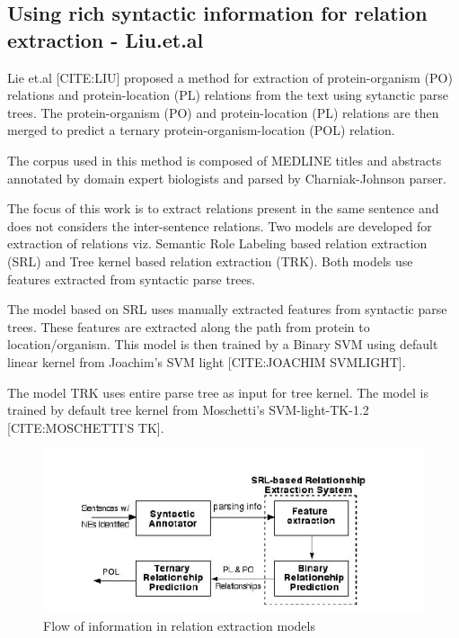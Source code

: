 \subsection*{Using rich syntactic information for relation extraction - Liu.et.al}

Lie et.al [CITE:LIU] proposed a method for extraction of protein-organism (PO) relations and protein-location (PL) relations from the text using sytanctic parse trees. The protein-organism (PO) and protein-location (PL) relations are then merged to predict a ternary protein-organism-location (POL) relation.

The corpus used in this method is composed of MEDLINE titles and abstracts annotated by domain expert biologists and parsed by Charniak-Johnson parser.

The focus of this work is to extract relations present in the same sentence and does not considers the inter-sentence relations. Two models are developed for extraction of relations viz. Semantic Role Labeling based relation extraction (SRL) and Tree kernel based relation extraction (TRK). Both models use features extracted from syntactic parse trees.

The model based on SRL uses manually extracted features from syntactic parse trees. These features are extracted along the path from protein to location/organism. This model is then trained by a Binary SVM using default linear kernel from Joachim’s SVM light [CITE:JOACHIM SVMLIGHT].

The model TRK uses entire parse tree as input for tree kernel. The model is trained by default tree kernel from Moschetti’s SVM-light-TK-1.2 [CITE:MOSCHETTI'S TK].

\begin{figure}[hbtp]
\includegraphics[scale=1]{figures/Liu_Flow.png}
\caption{Flow of information in relation extraction models }\label{fig:Liu}
\end{figure}


